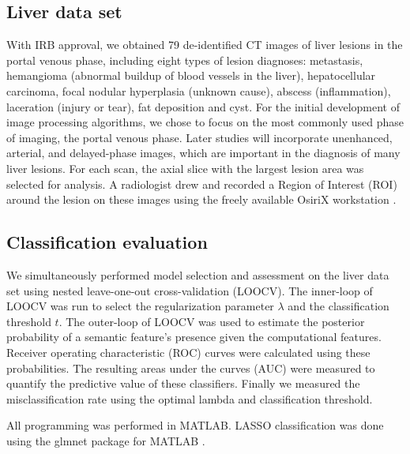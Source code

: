 \subsection{Liver data set}
With IRB approval, we obtained 79 de-identified CT images of liver lesions in the portal venous phase, including eight types of lesion diagnoses: metastasis, hemangioma (abnormal buildup of blood vessels in the liver), hepatocellular carcinoma, focal nodular hyperplasia (unknown cause), abscess (inflammation), laceration (injury or tear), fat deposition and cyst. For the initial development of image processing algorithms, we chose to focus on the most commonly used phase of imaging, the portal venous phase. Later studies will incorporate unenhanced, arterial, and delayed-phase images, which are important in the diagnosis of many liver lesions. For each scan, the axial slice with the largest lesion area was selected for analysis. A radiologist drew and recorded a Region of Interest (ROI) around the lesion on these images using the freely available OsiriX workstation \cite{Armato:2007ks,Rosset:2004kk}.

\subsection{Classification evaluation}

We simultaneously performed model selection and assessment on the liver data set using nested leave-one-out cross-validation (LOOCV). The inner-loop of LOOCV was run to select the regularization parameter $\lambda$ and the classification threshold $t$. The outer-loop of LOOCV was used to estimate the posterior probability of a semantic feature's presence given the computational features. Receiver operating characteristic (ROC) curves were calculated using these probabilities. The resulting areas under the curves (AUC) were measured to quantify the predictive value of these classifiers. Finally we measured the misclassification rate using the optimal lambda and classification threshold.

All programming was performed in MATLAB. LASSO classification was done using the glmnet package for MATLAB \cite{Friedman:2009wm}.